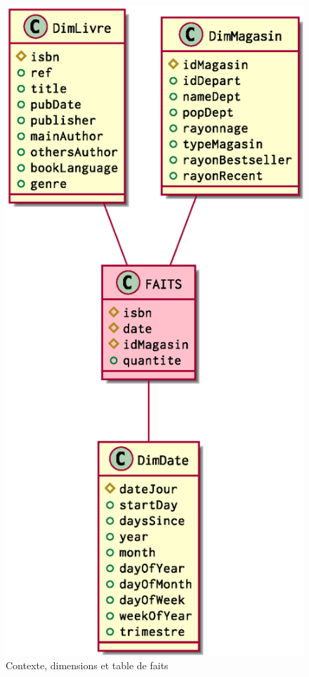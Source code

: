 	\begin{figure}
      \centerline{\includegraphics[scale=0.5]{contexte.eps}}
      \caption{Contexte, dimensions et table de faits}
      \label{contexte}
  	\end{figure}
  	

